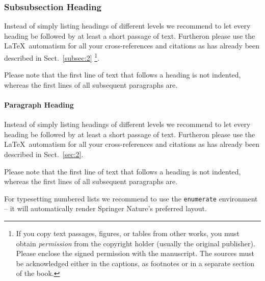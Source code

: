 \subsubsection{Subsubsection Heading}
Instead of simply listing headings of different levels we recommend to let every heading be followed by at least a short passage of text. Furtheron please use the \LaTeX\ automatism for all your cross-references and citations as has already been described in Sect.~\ref{subsec:2}%
\footnote{If you copy text passages, figures, or tables from other works, you must obtain \textit{permission} from the copyright holder (usually the original publisher). Please enclose the signed permission with the manuscript. The sources must be acknowledged either in the captions, as footnotes or in a separate section of the book.}.

Please note that the first line of text that follows a heading is not indented, whereas the first lines of all subsequent paragraphs are.


\paragraph{Paragraph Heading} %
Instead of simply listing headings of different levels we recommend to let every heading be followed by at least a short passage of text. Furtheron please use the \LaTeX\ automatism for all your cross-references and citations as has already been described in Sect.~\ref{sec:2}.

Please note that the first line of text that follows a heading is not indented, whereas the first lines of all subsequent paragraphs are.

For typesetting numbered lists we recommend to use the \verb|enumerate| environment -- it will automatically render Springer Nature's preferred layout.

